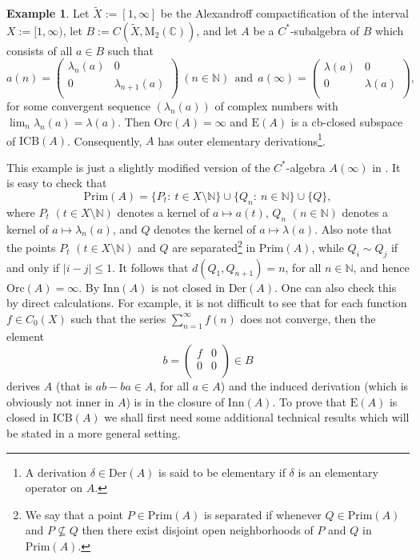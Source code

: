 \documentclass[]{amsart}
\theoremstyle{remark}
\theoremstyle{definition}
\newtheorem{example}[theorem]{Example}
\theoremstyle{question}
\numberwithin{equation}{section}
\begin{document}
\begin{example}\label{orc} Let $\tilde{X}:=[1, \infty]$ be the Alexandroff
compactification of the interval $X:= [1, \infty)$, let
$B:=C(\tilde{X},{\mathrm{M}}_2({\mathbb{C}}))$, and let $A$ be a $C^*$-subalgebra of $B$ which
consists of all $a \in B$ such that
$$a(n)=\left( \begin{array}{cc}
               \lambda_n(a) & 0 \\
              0 & \lambda_{n+1}(a)\\
               \end{array} \right) \  (n \in {\mathbb{N}}) \ \ \mathrm{and} \ \ a(\infty)=\left( \begin{array}{cc}
               \lambda(a) & 0 \\
              0 & \lambda(a)\\
               \end{array} \right),$$
for some convergent sequence $(\lambda_n(a))$ of complex
numbers with $\lim_n \lambda_n(a)=\lambda(a)$.
Then $\mathrm{Orc}(A)=\infty$ and ${\mathrm{E}}(A)$ is a cb-closed subspace of
$\mathrm{ICB}(A)$. Consequently, $A$ has outer elementary derivations\footnote{A derivation $\delta\in \mathrm{Der}(A)$ is said to be elementary if
$\delta$ is an elementary operator on $A$.}.
\end{example}
This example is just a slightly modified version of the $C^*$-algebra
$A(\infty)$ in \cite[2.8]{Som3}. It is easy to check that
$$\mathrm{Prim}(A)=\{P_t :  \ t \in X \setminus {\mathbb{N}}\} \cup \{Q_n : \ n \in {\mathbb{N}}\}
\cup\{ Q\},$$
where $P_t$ $(t \in X \setminus {\mathbb{N}})$ denotes a kernel of $a \mapsto a(t)$,
$Q_n$ $(n \in {\mathbb{N}})$ denotes a kernel of $a \mapsto \lambda_n(a)$, and $Q$ denotes
the kernel of $a \mapsto \lambda(a)$. Also note that the points $P_t$ $(t \in X
\setminus {\mathbb{N}})$ and $Q$ are separated\footnote{We say that a point $P\in \mathrm{Prim}(A)$ is separated if whenever $Q \in \mathrm{Prim}(A)$ and $P \nsubseteq Q$ then there exist disjoint open neighborhoods of $P$ and $Q$ in $\mathrm{Prim}(A)$.} in $\mathrm{Prim}(A)$, while $Q_i \sim Q_j$
if and only if $|i-j|\leq 1$. It follows that $d(Q_1,Q_{n+1})=n$, for all $n \in
{\mathbb{N}}$, and hence $\mathrm{Orc}(A)=\infty$. By \cite[4.6]{Som3}
$\mathrm{Inn}(A)$ is not closed in $\mathrm{Der}(A)$. One can also check this by
direct calculations. For example, it is not difficult to see that for each
function $f \in C_0(X)$ such that the series $\sum_{n=1}^\infty f(n)$ does not
converge, then the element $$b=\left( \begin{array}{cc}
               f & 0 \\
              0 & 0\\
               \end{array} \right) \in B$$
derives $A$ (that is $ab-ba \in A$, for all $a \in A$) and the induced
derivation (which is obviously not inner in $A$) is in the
closure of $\mathrm{Inn}(A)$. To prove that ${\mathrm{E}}(A)$ is closed in
$\mathrm{ICB}(A)$ we shall first need some additional technical results which will be stated in a more general setting.
\medskip
\end{document}
